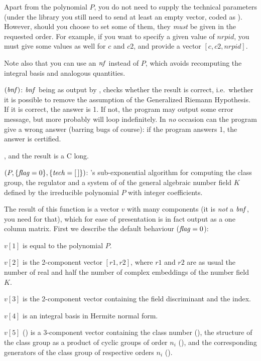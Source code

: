 Apart from the polynomial $P$, you do not need to supply the technical
parameters (under the library you still need to send at least an empty
vector, coded as ). However, should you choose to set some of them,
they \emph{must} be given in the requested order. For example, if you want to
specify a given value of $nrpid$, you must give some values as well for $c$
and $c2$, and provide a vector $[c,c2,nrpid]$.

Note also that you can use an $\hbox{\it nf\/}$ instead of $P$, which avoids
recomputing the integral basis and analogous quantities.

\smallskip
{}$(\hbox{\it bnf\/})$: $\hbox{\it bnf\/}$ being as output by
, checks whether the result is correct, i.e.~whether it is
possible to remove the assumption of the Generalized Riemann
Hypothesis. If it is correct, the answer is 1. If not, the program
may output some error message, but more probably will loop indefinitely. In
\emph{no} occasion can the program give a wrong answer (barring bugs of
course): if the program answers 1, the answer is certified.

, and the result is a C long.

$(P,\{\hbox{\it f\kern0pt lag\/}=0\},\{\hbox{\it tech\/}=[\,]\})$: 's
sub-exponential algorithm for computing the class group, the regulator and a
system of  of the general algebraic number field $K$
defined by the irreducible polynomial $P$ with integer coefficients.

The result of this function is a vector $v$ with many components (it is
\emph{not} a $\hbox{\it bnf\/}$, you need  for that), which for ease of
presentation is in fact output as a one column matrix. First we describe the
default behaviour ($\hbox{\it f\kern0pt lag\/}=0$):

 $v[1]$ is equal to the polynomial $P$.

 $v[2]$ is the 2-component vector $[r1,r2]$, where $r1$ and $r2$ are as usual
the number of real and half the number of complex embeddings of the number
field $K$.

 $v[3]$ is the 2-component vector containing the field discriminant and the
index.

 $v[4]$ is an integral basis in Hermite normal form.

 $v[5]$ () is a 3-component vector containing the class number
(), the structure of the class group as a product of cyclic
groups of order $n_i$ (), and the corresponding generators
of the class group of respective orders $n_i$ ().

